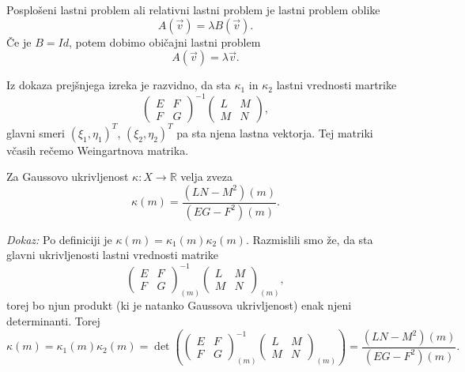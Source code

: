 \begin{definicija}
\label{def_posploseni_lastni_problem}
 Posplošeni lastni problem ali relativni lastni problem je lastni problem oblike \begin{equation*}
   A(\vec{v}) = \lambda B(\vec{v}).
 \end{equation*}  
  Če je $B = Id$, potem dobimo običajni lastni problem \begin{equation*}
    A(\vec{v}) = \lambda \vec{v}.
  \end{equation*}  
\end{definicija}

Iz dokaza prejšnjega izreka je razvidno, da sta $\kappa_1$ in $\kappa_2$ lastni vrednosti martrike \begin{equation*}
  \begin{pmatrix}
  E & F \\
  F & G
  \end{pmatrix}^{-1}\begin{pmatrix}
  L & M \\
  M & N
  \end{pmatrix},
\end{equation*}  
  glavni smeri $(\xi_1, \eta_1)^{T}$, $(\xi_2, \eta_2)^{T}$ pa sta njena lastna vektorja. Tej matriki včasih rečemo
  Weingartnova matrika.


\begin{izrek}
\label{izr_izrazava_gaussove_ukrivljenosti}
Za Gaussovo ukrivljenost $\kappa: X \to  \mathbb{R}$ velja zveza \begin{equation*}
\kappa(m) = \frac{(LN - M^2)(m)}{(EG - F^2)(m)}. 
\end{equation*}  
\end{izrek}

\noindent
{\em Dokaz:\/}
Po definiciji je $\kappa(m) = \kappa_1(m) \kappa_2(m)$. Razmislili smo že, da sta glavni ukrivljenosti
lastni vrednosti matrike \begin{equation*}
  \begin{pmatrix}
    E & F \\
    F & G
    \end{pmatrix}_{(m)}^{-1}\begin{pmatrix}
    L & M \\
    M & N
    \end{pmatrix}_{(m)},
\end{equation*}  
  torej bo njun produkt (ki je natanko Gaussova ukrivljenost) enak njeni determinanti. Torej \begin{equation*}
    \kappa(m) = \kappa_1(m) \kappa_2(m) = \det \left(  \begin{pmatrix}
      E & F \\
      F & G
      \end{pmatrix}_{(m)}^{-1}\begin{pmatrix}
      L & M \\
      M & N
      \end{pmatrix}_{(m)} \right) = \frac{(LN - M^2)(m)}{(EG - F^2)(m)}.
  \end{equation*}  
    
